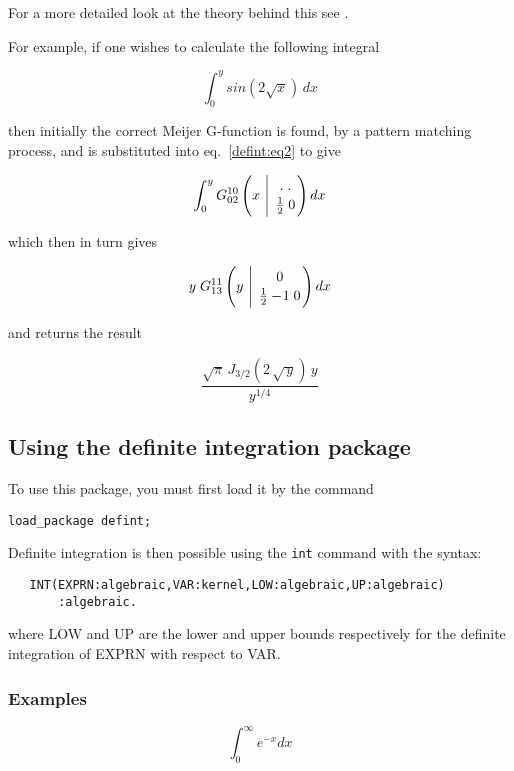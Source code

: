 For a more detailed look at the theory behind this see 
\cite{Adamchik:90}.

For example, if one wishes to calculate the following integral

\begin{displaymath}
\int_{0}^{y} sin(2 \sqrt{x}) \, dx 
\end{displaymath}

then initially the correct Meijer G-function is found, by a pattern 
matching process, and is substituted 
into eq.~\ref{defint:eq2} to give

\begin{displaymath}
\int_{0}^{y} G^{1 0}_{0 2}\left(x 
\ \Bigg\vert \ \MeijerGparams{. \; .}{\frac{1}{2} \; 0} \right) dx
\end{displaymath}

which then in turn gives

\begin{displaymath}
y \; G^{1 1}_{1 3}\left(y \ \Bigg\vert \ \MeijerGparams{0}{\frac{1}{2} -\!1 \; 0} \right) dx
\end{displaymath}

and returns the result

\begin{displaymath}
\frac{\sqrt{\pi} \, J_{3/2}(2 \, \sqrt{\,y}) \, y}{y^{1/4}}
\end{displaymath}

\subsection{Using the definite integration package}
To use this package, you must first load it by the command
\begin{verbatim}
load_package defint;
\end{verbatim}
Definite integration is then possible using the \verb+int+
command with the syntax:
\begin{verbatim}
   INT(EXPRN:algebraic,VAR:kernel,LOW:algebraic,UP:algebraic)
       :algebraic.
\end{verbatim}
where LOW and UP are the lower and upper bounds respectively for
the definite integration of EXPRN with respect to VAR.

\subsubsection{Examples}

\begin{displaymath}
\int_{0}^{\infty} e^{-x} dx 
\end{displaymath}


